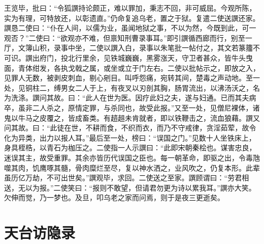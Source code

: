 \documentclass[a4paper,12pt,UTF8,twoside]{ctexbook}
\begin{document}
王览毕，批曰：“令狐譔持论颇正，难以罪加，秉志不回，非可威屈。今观所陈，实为有理，可特放还，以彰遗直。”仍命复追乌老，置之于狱。复遣二使送譔还家。譔恳二使曰：“仆在人间，以儒为业，虽闻地狱之事，不以为然，今既到此，可一观否？”二使曰：“欲观亦不难，但禀知刑曹录事耳。”即引譔循西廊而行，别至一厅，文簿山积，录事中坐，二使以譔入白，录事以朱笔批一帖付之，其文若篆籒不可识。譔出府门，投北行里余，见铁城巍巍，黑雾涨天，守卫者甚众，皆牛头曳面，青体绀发，各执戈戟之属，或坐或立于门左右。二使以批帖示之，即放之入，见罪人无数，被剥皮刺血，剔心剜目。叫呼怨痛，宛转其间，楚毒之声动地。至一处，见铜柱二，缚男女二人于上，有夜叉以刃剖其胸，肠胃流出，以沸汤沃之，名为洗涤。譔问其故。曰：“此人在世为医。因疗此妇之夫，遂与妇通。已而其夫病卒，虽非二人杀之，原情定罪，与杀同也，故受此报。”又至一处，见僧尼裸体，诸鬼以牛马之皮覆之，皆成畜类。有趦趄未肯就者，即以铁鞭击之，流血狼藉。譔又问其故。曰：“此徒在世，不耕而食，不织而衣，而乃不守戒律，贪淫茹荤，故令化为异类，出力以报人耳。”最后至一处，榜曰：“误国之门。”见数十人坐铁床上，身具桎梏，以青石为枷压之。二使指一人示譔曰：“此即宋朝秦桧也。谋害忠良，迷误其主，故受重罪。其余亦皆历代误国之臣也。每一朝革命，即驱之出，令毒虺噬其肉，饥鹰啄其髓，骨肉糜烂至尽，复以神水洒之，业风吹之，仍复本形。此辈虽历亿万劫，不可出世矣。”譔观毕，求回。二使送之至家。譔顾谓曰：“劳君相送，无以为报。”二使笑曰：“报则不敢望，但请君勿更为诗以累我耳。”譔亦大笑。欠伸而觉，乃一梦也。及旦，叩乌老之家而问焉，则于是夜三更逝矣。

\chapter{天台访隐录}
\end{document}
